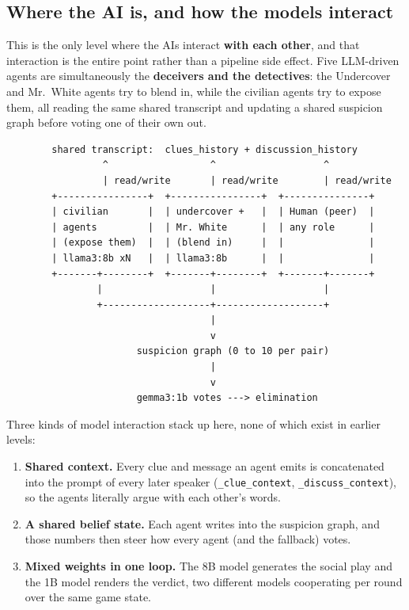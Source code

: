 \documentclass[11pt,a4paper]{article}
\begin{document}
\subsection{Where the AI is, and how the models interact}
This is the only level where the AIs interact \textbf{with each other}, and that
interaction is the entire point rather than a pipeline side effect. Five
LLM-driven agents are simultaneously the \textbf{deceivers and the detectives}:
the Undercover and Mr.\ White agents try to blend in, while the civilian agents
try to expose them, all reading the same shared transcript and updating a shared
suspicion graph before voting one of their own out.

\begin{lstlisting}
        shared transcript:  clues_history + discussion_history
                 ^                  ^                   ^
                 | read/write       | read/write        | read/write
        +----------------+  +----------------+  +---------------+
        | civilian       |  | undercover +   |  | Human (peer)  |
        | agents         |  | Mr. White      |  | any role      |
        | (expose them)  |  | (blend in)     |  |               |
        | llama3:8b xN   |  | llama3:8b      |  |               |
        +-------+--------+  +-------+--------+  +-------+-------+
                |                   |                   |
                +-------------------+-------------------+
                                    |
                                    v
                       suspicion graph (0 to 10 per pair)
                                    |
                                    v
                       gemma3:1b votes ---> elimination
\end{lstlisting}

Three kinds of model interaction stack up here, none of which exist in earlier
levels:
\begin{enumerate}[leftmargin=*,itemsep=2pt]
    \item \textbf{Shared context.} Every clue and message an agent emits is
    concatenated into the prompt of every later speaker (\texttt{\_clue\_context},
    \texttt{\_discuss\_context}), so the agents literally argue with each other's
    words.
    \item \textbf{A shared belief state.} Each agent writes into the suspicion
    graph, and those numbers then steer how every agent (and the fallback) votes.
    \item \textbf{Mixed weights in one loop.} The 8B model generates the social
    play and the 1B model renders the verdict, two different models cooperating
    per round over the same game state.
\end{enumerate}
\end{document}
